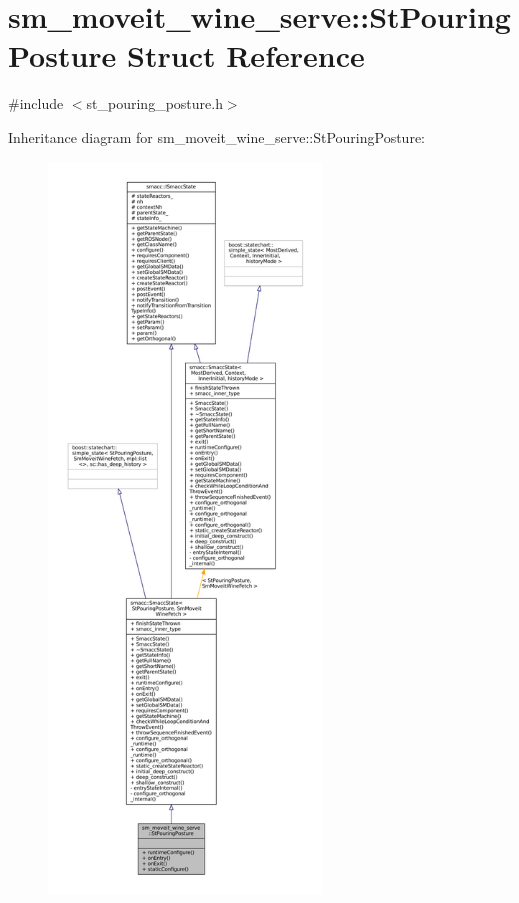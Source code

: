\hypertarget{structsm__moveit__wine__serve_1_1StPouringPosture}{}\section{sm\+\_\+moveit\+\_\+wine\+\_\+serve\+:\+:St\+Pouring\+Posture Struct Reference}
\label{structsm__moveit__wine__serve_1_1StPouringPosture}


{\ttfamily \#include $<$st\+\_\+pouring\+\_\+posture.\+h$>$}



Inheritance diagram for sm\+\_\+moveit\+\_\+wine\+\_\+serve\+:\+:St\+Pouring\+Posture\+:
\nopagebreak
\begin{figure}[H]
\begin{center}
\leavevmode
\includegraphics[height=550pt]{structsm__moveit__wine__serve_1_1StPouringPosture__inherit__graph}
\end{center}
\end{figure}


